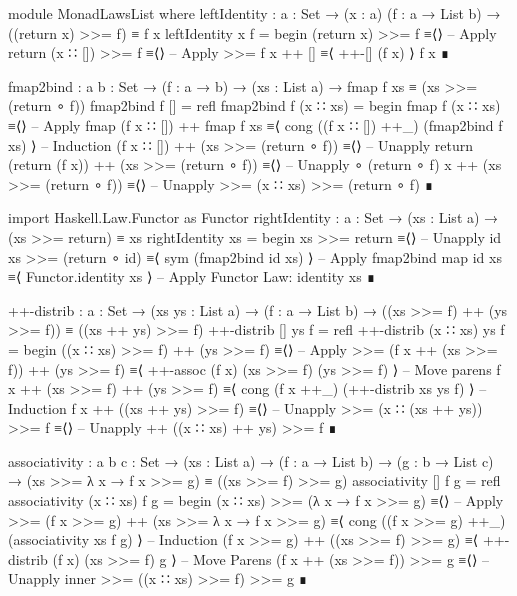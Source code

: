 \documentclass{article}
\begin{document}
\begin{code}
module MonadLawsList where
  leftIdentity : {a : Set} → (x : a) (f : a → List b)
    → ((return x) >>= f) ≡ f x
  leftIdentity x f =
    begin
      (return x) >>= f
    ≡⟨⟩ -- Apply return
      (x ∷ []) >>= f
    ≡⟨⟩ -- Apply >>=
      f x ++ []
    ≡⟨ ++-[] (f x) ⟩
      f x
    ∎
\end{code}
\begin{code}
  fmap2bind : {a b : Set} → (f : a → b) → (xs : List a)
    → fmap f xs ≡ (xs >>= (return ∘ f))
  fmap2bind f [] = refl
  fmap2bind f (x ∷ xs) =
    begin
      fmap f (x ∷ xs)
    ≡⟨⟩ -- Apply fmap
      (f x ∷ []) ++ fmap f xs
    ≡⟨ cong ((f x ∷ []) ++_) (fmap2bind f xs) ⟩ -- Induction
      (f x ∷ []) ++ (xs >>= (return ∘ f))
    ≡⟨⟩ -- Unapply return
      (return (f x)) ++ (xs >>= (return ∘ f))
    ≡⟨⟩ -- Unapply ∘
      (return ∘ f) x ++ (xs >>= (return ∘ f))
    ≡⟨⟩ -- Unapply >>=
      (x ∷ xs) >>= (return ∘ f)
    ∎
\end{code}
\begin{code}
  import Haskell.Law.Functor as Functor
  rightIdentity : {a : Set} → (xs : List a) → (xs >>= return) ≡ xs
  rightIdentity xs =
    begin
      xs >>= return
    ≡⟨⟩ -- Unapply id
      xs >>= (return ∘ id)
    ≡⟨ sym (fmap2bind id xs) ⟩ -- Apply fmap2bind
      map id xs
    ≡⟨ Functor.identity xs ⟩ -- Apply Functor Law: identity
      xs
    ∎
\end{code}
\begin{code}
  ++-distrib : {a : Set} → (xs ys : List a) → (f : a → List b)
    → ((xs >>= f) ++ (ys >>= f)) ≡ ((xs ++ ys) >>= f)
  ++-distrib [] ys f = refl
  ++-distrib (x ∷ xs) ys f =
    begin
      ((x ∷ xs) >>= f) ++ (ys >>= f)
    ≡⟨⟩ -- Apply >>=
      (f x ++ (xs >>= f)) ++ (ys >>= f)
    ≡⟨ ++-assoc (f x) (xs >>= f) (ys >>= f) ⟩ -- Move parens
      f x ++ (xs >>= f) ++ (ys >>= f)
    ≡⟨ cong (f x ++_) (++-distrib xs ys f) ⟩ -- Induction
      f x ++ ((xs ++ ys) >>= f)
    ≡⟨⟩ -- Unapply >>=
      (x ∷ (xs ++ ys)) >>= f
    ≡⟨⟩ -- Unapply ++
      ((x ∷ xs) ++ ys) >>= f
    ∎
\end{code}
\begin{code}
  associativity : {a b c : Set}
    → (xs : List a) → (f : a → List b) → (g : b → List c)
    → (xs >>= λ x → f x >>= g) ≡ ((xs >>= f) >>= g)
  associativity [] f g = refl
  associativity (x ∷ xs) f g =
    begin
      (x ∷ xs) >>= (λ x → f x >>= g)
    ≡⟨⟩ -- Apply >>=
      (f x >>= g) ++ (xs >>= λ x → f x >>= g)
    ≡⟨ cong ((f x >>= g) ++_) (associativity xs f g) ⟩ -- Induction
      (f x >>= g) ++ ((xs >>= f) >>= g)
    ≡⟨ ++-distrib (f x) (xs >>= f) g ⟩ -- Move Parens
      (f x ++ (xs >>= f)) >>= g
    ≡⟨⟩ -- Unapply inner >>=
      ((x ∷ xs) >>= f) >>= g
    ∎
\end{code}
\end{document}
